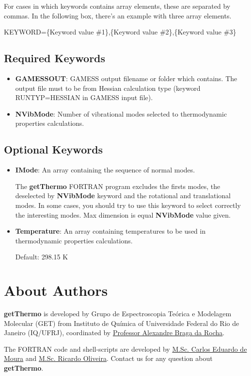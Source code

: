 \documentclass[11pt,oneside,a4paper]{article}
\begin{document}
For cases in which keywords contains array elements, these are separated by commas. In the following box, there's an example with three array elements.
\begin{shaded}
KEYWORD=\{Keyword value \#1\},\{Keyword value \#2\},\{Keyword value \#3\}
\end{shaded}

\subsection{Required Keywords}
\begin{itemize}
\item \textbf{GAMESSOUT}: GAMESS output filename or folder which contains. The output file must to be from Hessian calculation type (keyword RUNTYP=HESSIAN in GAMESS input file).
\item \textbf{NVibMode}: Number of vibrational modes selected to thermodynamic properties calculations.
\end{itemize}

\subsection{Optional Keywords}
\begin{itemize}
\item \textbf{IMode}: An array containing the sequence of normal modes.

The \textbf{getThermo} FORTRAN program excludes	the firsts modes, the deselected by \textbf{NVibMode} keyword and the rotational and translational modes. In some cases, you should try to use this keyword to select correctly the interesting modes. Max dimension is equal \textbf{NVibMode} value given.

\item \textbf{Temperature}: An array containing temperatures to be used in thermodynamic properties calculations.

Default: 298.15 K
\end{itemize}

\pagebreak
\section[About Authors]{About Authors}

\textbf{getThermo} is developed by Grupo de Espectroscopia Teórica e Modelagem Molecular (GET) from Instituto de Química of Universidade Federal do Rio de Janeiro (IQ/UFRJ), coordinated by  \href{mailto:rocha@iq.ufrj.br}{Professor Alexandre Braga da Rocha}.

The FORTRAN code and shell-scripts are developed by \href{mailto:carlosevmoura@iq.ufrj.br}{M.Sc. Carlos Eduardo de Moura} and \href{mailto:rrjunior@iq.ufrj.br}{M.Sc. Ricardo Oliveira}. Contact us for any question about \textbf{getThermo}.

\pagebreak


\end{document}
